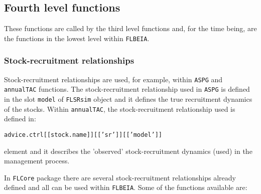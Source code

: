 
\subsection{Fourth level functions}

  These functions are called by the third level functions and, for the time being, are the functions 
in the lowest level within \texttt{FLBEIA}. 

\subsubsection{Stock-recruitment relationships} \label{sec:SRR}
	Stock-recruitment relationships are used, for example, within \texttt{ASPG} and \texttt{annualTAC} functions. The stock-recruitment 
	relationship used in \texttt{ASPG} is defined in the slot \texttt{model} of \texttt{FLSRsim} object and it defines the true
	recruitment dynamics of the stocks. Within \texttt{annualTAC}, the stock-recruitment relationship used is 
	defined in: 
		
		\begin{center}
			\texttt{advice.ctrl[[stock.name]][['sr']][['model']]}
		\end{center}

\noindent	element and it describes the 'observed' stock-recruitment dynamics (used) in the management process.

	In \texttt{FLCore} package there are several stock-recruitment relationships already defined and all can be 
	used within \texttt{FLBEIA}.
	Some of the functions available are:
	
